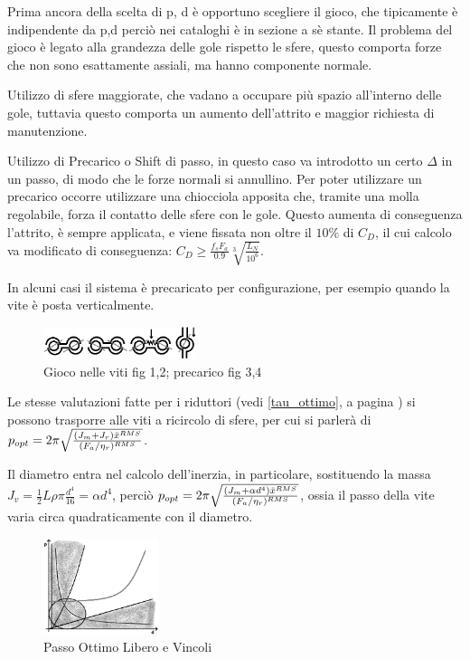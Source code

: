  \label{giocoViti}
Prima ancora della scelta di p, d è opportuno scegliere il gioco, che tipicamente è indipendente da p,d perciò nei cataloghi è in sezione a sè stante.
Il problema del gioco è legato alla grandezza delle gole rispetto le sfere, questo comporta forze che non sono esattamente assiali, ma hanno componente normale.

Utilizzo di sfere maggiorate, che vadano a occupare più spazio all'interno delle gole, tuttavia questo comporta un aumento dell'attrito e maggior richiesta di manutenzione.

Utilizzo di Precarico o Shift di passo, in questo caso va introdotto un certo \(\Delta\) in un passo, di modo che le forze normali si annullino. Per poter utilizzare un precarico occorre utilizzare una chiocciola apposita che, tramite una molla regolabile, forza il contatto delle sfere con le gole. Questo aumenta di conseguenza l'attrito, è sempre applicata, e viene fissata non oltre il \(10\%\) di \(C_D\), il cui calcolo va modificato di conseguenza: \( C_D \geqslant \frac{f_s F_a}{0.9} \sqrt[3]{\frac{L_N}{10^6}} \).

In alcuni casi il sistema è precaricato per configurazione, per esempio quando la vite è posta verticalmente.

\begin{figure}[h]
    \centering
    \includegraphics[width=0.4\textwidth]{Immagini/gioco_viti_ricircolo.png}
    \caption{Gioco nelle viti fig 1,2; precarico fig 3,4}
\end{figure}

Le stesse valutazioni fatte per i riduttori (vedi \ref{tau_ottimo}, a pagina \pageref{tau_ottimo}) si possono trasporre alle viti a ricircolo di sfere, per cui si parlerà di \(p_{opt}=2\pi \sqrt{\frac{(J_m+J_r)\Ddot{x}^{RMS}}{(F_a/\eta_r)^{RMS}}}\).

Il diametro entra nel calcolo dell'inerzia, in particolare, sostituendo la massa \(J_v=\frac{1}{2}L\rho \pi \frac{d^4}{16} = \alpha d^4\), perciò \(p_{opt}=2\pi \sqrt{\frac{(J_m+\alpha d^4)\Ddot{x}^{RMS}}{(F_a/\eta_r)^{RMS}}}\), ossia il passo della vite varia circa quadraticamente con il diametro.
\begin{figure}[h]
    \centering
    \includegraphics[width=0.3\textwidth]{Immagini/passo_ottimo_libero.png}
    \caption{Passo Ottimo Libero e Vincoli}
\end{figure}

